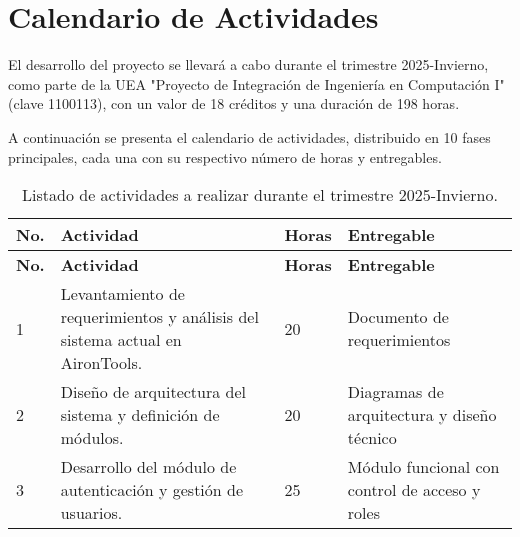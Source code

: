\section{Calendario de Actividades}

El desarrollo del proyecto se llevará a cabo durante el trimestre 2025-Invierno, como parte de la UEA "Proyecto de Integración de Ingeniería en Computación I" (clave 1100113), con un valor de 18 créditos y una duración de 198 horas.

A continuación se presenta el calendario de actividades, distribuido en 10 fases principales, cada una con su respectivo número de horas y entregables.

\begin{longtable}{p{} p{} p{} p{}}
	\label{table:calendarioActividades}                                                                                                                                               \\
	\toprule
	\textbf{No.} & \textbf{Actividad}                                                           & \textbf{Horas} & \textbf{Entregable}                                                \\
	\hline
	\endfirsthead

	\hline
	\textbf{No.} & \textbf{Actividad}                                                           & \textbf{Horas} & \textbf{Entregable}                                                \\
	\hline
	\endhead

	\hline
	\caption{Listado de actividades a realizar durante el trimestre 2025-Invierno.}
	\endlastfoot

	1            & Levantamiento de requerimientos y análisis del sistema actual en AironTools. & 20             & Documento de requerimientos                                        \\
	\midrule

	2            & Diseño de arquitectura del sistema y definición de módulos.                  & 20             & Diagramas de arquitectura y diseño técnico                         \\
	\midrule

	3            & Desarrollo del módulo de autenticación y gestión de usuarios.                & 25             & Módulo funcional con control de acceso y roles                     \\
	\midrule


\end{longtable}
